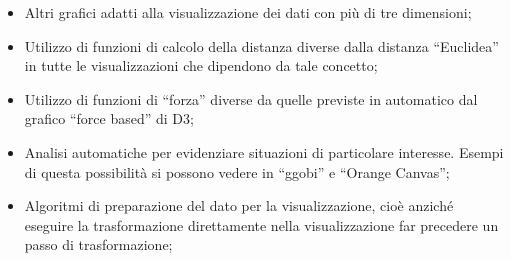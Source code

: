 \begin{itemize}
	\item Altri grafici adatti alla visualizzazione dei dati con più di tre dimensioni;
	\item Utilizzo di funzioni di calcolo della distanza diverse dalla distanza “Euclidea” in tutte le
visualizzazioni che dipendono da tale concetto;
	\item Utilizzo di funzioni di “forza” diverse da quelle previste in automatico dal grafico “force
based” di D3;
	\item Analisi automatiche per evidenziare situazioni di particolare interesse. Esempi di questa
possibilità si possono vedere in “ggobi” e “Orange Canvas”;
	\item Algoritmi di preparazione del dato per la visualizzazione, cioè anziché eseguire la
trasformazione direttamente nella visualizzazione far precedere un passo di trasformazione;
\end{itemize}